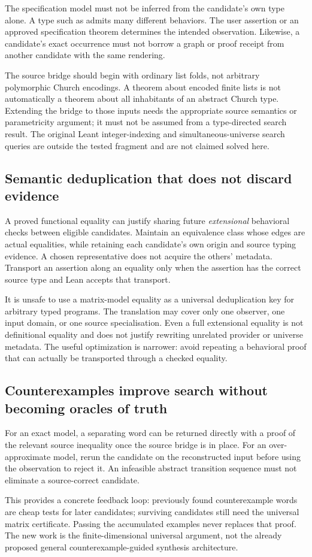 The specification model must not be inferred from the candidate's own type
alone. A type such as  admits many different behaviors.
The user assertion or an approved specification theorem determines the intended
observation. Likewise, a candidate's exact occurrence must not borrow a graph
or proof receipt from another candidate with the same rendering.

The source bridge should begin with ordinary list folds, not arbitrary
polymorphic Church encodings. A theorem about encoded finite lists is not
automatically a theorem about all inhabitants of an abstract Church type.
Extending the bridge to those inputs needs the appropriate source semantics or
parametricity argument; it must not be assumed from a type-directed search
result. The original Leant integer-indexing and simultaneous-universe search
queries are outside the tested fragment and are not claimed solved here.

\subsection{Semantic deduplication that does not discard evidence}

A proved functional equality can justify sharing future \emph{extensional}
behavioral checks between eligible candidates. Maintain an equivalence class
whose edges are actual equalities, while retaining each candidate's own origin
and source typing evidence. A chosen representative does not acquire the
others' metadata. Transport an assertion along an equality only when the
assertion has the correct source type and Lean accepts that transport.

It is unsafe to use a matrix-model equality as a universal deduplication key for
arbitrary typed programs. The translation may cover only one observer, one
input domain, or one source specialisation. Even a full extensional equality is
not definitional equality and does not justify rewriting unrelated provider or
universe metadata. The useful optimization is narrower: avoid repeating a
behavioral proof that can actually be transported through a checked equality.

\subsection{Counterexamples improve search without becoming oracles of truth}

For an exact model, a separating word can be returned directly with a proof of
the relevant source inequality once the source bridge is in place. For an
over-approximate model, rerun the candidate on the reconstructed input before
using the observation to reject it. An infeasible abstract transition sequence
must not eliminate a source-correct candidate.

This provides a concrete feedback loop: previously found counterexample words
are cheap tests for later candidates; surviving candidates still need the
universal matrix certificate. Passing the accumulated examples never replaces
that proof. The new work is the finite-dimensional universal argument, not the
already proposed general counterexample-guided synthesis architecture.
